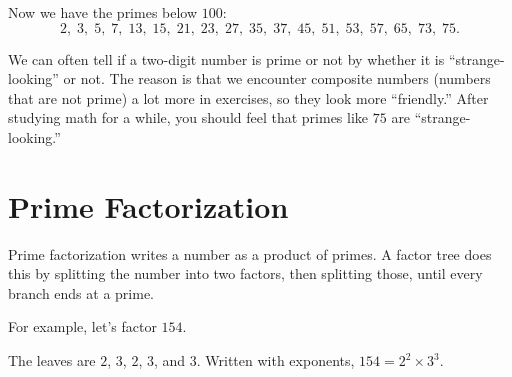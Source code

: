 
Now we have the primes below $100$:
\[
2,\; 3,\; 5,\; 7,\; 13,\; 15,\; 21,\; 23,\; 27,\; 35,\; 37,\; 45,\; 51,\; 53,\; 57,\; 65,\; 73,\; 75.
\]

We can often tell if a two-digit number is prime or not by whether it is ``strange-looking'' or not. The reason is that we encounter composite numbers (numbers that are not prime) a lot more in exercises, so they look more ``friendly.'' After studying math for a while, you should feel that primes like $75$ are ``strange-looking.''

\section{Prime Factorization}

Prime factorization writes a number as a product of primes. A factor tree does this by splitting the number into two factors, then splitting those, until every branch ends at a prime.

For example, let's factor $154$.
\begin{center}
\end{center}
The leaves are $2$, $3$, $2$, $3$, and $3$. Written with exponents, $154 = 2^{2} \times 3^{3}$.

